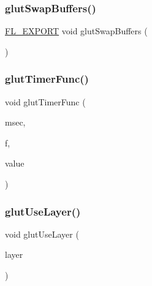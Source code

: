\subsubsection{\texorpdfstring{glut\+Swap\+Buffers()}{glutSwapBuffers()}}
{\footnotesize\ttfamily \hyperlink{_fl___export_8_h_aa9ba29a18aee9d738370a06eeb4470fc}{F\+L\+\_\+\+E\+X\+P\+O\+RT} void glut\+Swap\+Buffers (\begin{DoxyParamCaption}{ }\end{DoxyParamCaption})}

\mbox{\label{glut_8_h_a3fa33b4e146b579c34e4dde9c069d044}} 
\subsubsection{\texorpdfstring{glut\+Timer\+Func()}{glutTimerFunc()}}
{\footnotesize\ttfamily void glut\+Timer\+Func (\begin{DoxyParamCaption}\item[{unsigned int}]{msec,  }\item[{void($\ast$)(int)}]{f,  }\item[{int}]{value }\end{DoxyParamCaption})\hspace{0.3cm}{\ttfamily [inline]}}

\mbox{\label{glut_8_h_ade779ec3cdd82635184fb520bc500c8e}} 
\subsubsection{\texorpdfstring{glut\+Use\+Layer()}{glutUseLayer()}}
{\footnotesize\ttfamily void glut\+Use\+Layer (\begin{DoxyParamCaption}\item[{G\+Lenum}]{layer }\end{DoxyParamCaption})\hspace{0.3cm}{\ttfamily [inline]}}

\mbox{\label{glut_8_h_a9f9e3251dc7344af2a97de6e9ce14ffa}} 
